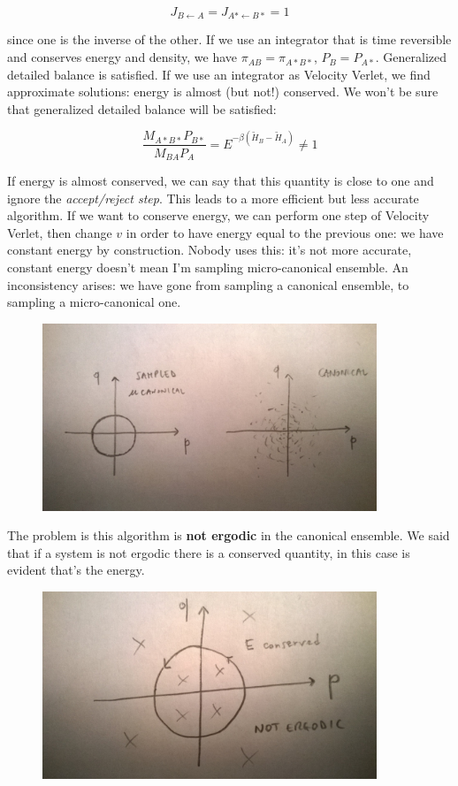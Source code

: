 \documentclass[a4paper, italian, openany]{book}
\begin{document}
$$J_{B \leftarrow A} = J_{A* \leftarrow B*} = 1$$

since one is the inverse of the other.\newline
If we use an integrator that is time reversible and conserves energy and density, we have $\pi_{AB} = \pi_{A*B*}$, $P_B = P_{A*}$. Generalized detailed balance is satisfied.\newline
If we use an integrator as Velocity Verlet, we find approximate solutions: energy is almost (but not!) conserved. We won't be sure that generalized detailed balance will be satisfied:

$$\frac{M_{A*B*}P_{B*}}{M_{BA}P_A} = E^{-\beta \left ( \tilde{H}_B - \tilde{H}_A \right )} \ne 1$$

If energy is almost conserved, we can say that this quantity is close to one and ignore the \textit{accept/reject step}. This leads to a more efficient but less accurate algorithm.\newline
If we want to conserve energy, we can perform one step of Velocity Verlet, then change $v$ in order to have energy equal to the previous one: we have constant energy by construction. Nobody uses this: it's not more accurate, constant energy doesn't mean I'm sampling micro-canonical ensemble.\newline
An inconsistency arises: we have gone from sampling a canonical ensemble, to sampling a micro-canonical one.

\begin{figure}[H]
\centering
\includegraphics[width=100mm]{img/pic19.jpg}
\end{figure}

The problem is this algorithm is \textbf{not ergodic} in the canonical ensemble. We said that if a system is not ergodic there is a conserved quantity, in this case is evident that's the energy.\newline

\begin{figure}[H]
\centering
\includegraphics[width=100mm]{img/pic20.jpg}
\end{figure}
\end{document}
